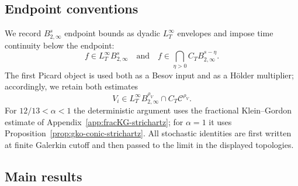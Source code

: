 \documentclass[10pt]{amsart}
\numberwithin{equation}{section}
\theoremstyle{plain}
\theoremstyle{definition}
\theoremstyle{remark}
\begin{document}
\subsection{Endpoint conventions}\label{subsec:theorem-conventions}
We record \(B_{2,\infty}^s\) endpoint bounds as dyadic \(L_T^\infty\) envelopes and impose time continuity below the endpoint:
\[
        f\in L_T^\infty B_{2,\infty}^{s}
        \quad\text{and}\quad
        f\in \bigcap_{\eta>0}C_TB_{2,\infty}^{s-\eta}.
\]
The first Picard object is used both as a Besov input and as a H\"older multiplier; accordingly, we retain both estimates
\[
        V_i\in L_T^\infty B_{2,\infty}^{\rho_V}
        \cap C_T\mathcal C^{\rho_V}.
\]
For \(12/13<\alpha<1\) the deterministic argument uses the fractional Klein--Gordon estimate of Appendix~\ref{app:fracKG-strichartz}; for \(\alpha=1\) it uses Proposition~\ref{prop:gko-conic-strichartz}.  All stochastic identities are first written at finite Galerkin cutoff and then passed to the limit in the displayed topologies.


\subsection{Main results}\label{sec:main-results}
\end{document}

